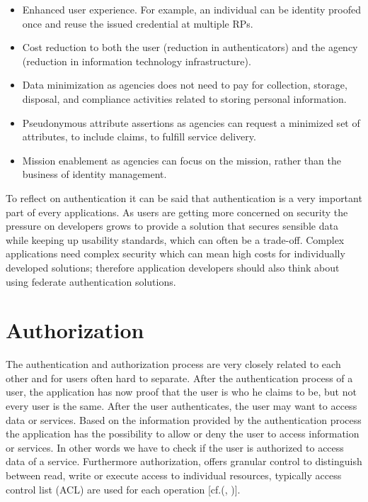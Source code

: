 \begin{itemize}
\item Enhanced user experience. For example, an individual can be identity proofed once and reuse the issued credential at multiple RPs. 
\item Cost reduction to both the user (reduction in authenticators) and the agency (reduction in information technology infrastructure). 
\item Data minimization as agencies does not need to pay for collection, storage, disposal, and compliance activities related to storing personal information. 
\item Pseudonymous attribute assertions as agencies can request a minimized set of attributes, to include claims, to fulfill service delivery. 
\item Mission enablement as agencies can focus on the mission, rather than the business of identity management.
\end{itemize}

To reflect on authentication it can be said that authentication is a very important part of every applications. As users are getting more concerned on security the pressure on developers grows to provide a solution that secures sensible data while keeping up usability standards, which can often be a trade-off. Complex applications need complex security which can mean high costs for individually developed solutions; therefore application developers should also think about using federate authentication solutions. 


\section{Authorization}


The authentication and authorization process are very closely related to each other and for users often hard to separate. After the authentication process of a user, the application has now proof that the user is who he claims to be, but not every user is the same. After  the user authenticates, the user may want to access data or services. Based on the information provided by the authentication process the application has the possibility to allow or deny the user to access information or services. In other words we have to check if the user is authorized to access data of a service. Furthermore authorization, offers granular control to distinguish between read, write or execute access to individual resources, typically access control list (ACL) are used for each operation [cf.(\cite{Todorov:2007:MUI}, \cite{Boyed:2012:GSOA})].

